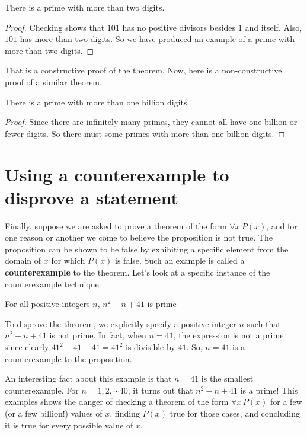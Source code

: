 \begin{thm}
 There is a prime with more than two digits.
\end{thm}
\begin{proof}
 Checking shows that $101$ has no positive divisors besides $1$ and itself. Also,
 $101$ has more than two digits. So we have produced an example of a prime with
 more than two digits.
\end{proof}

That is a constructive proof of the theorem. Now, here is a non-constructive proof
of a similar theorem.

\begin{thm}
 There is a prime with more than one billion digits.
\end{thm}
\begin{proof}
 Since there are infinitely many primes, they cannot all have one billion
 or fewer digits.
 So there must some primes with more than one billion digits.
\end{proof}


\section{Using a counterexample to disprove a statement}
Finally, suppose we are asked to prove a theorem of the form $\forall x\ P(x)$, and 
for one reason or another we come to believe the proposition is not true. The proposition
can be shown to be false by exhibiting a specific element from the domain of $x$ for
which $P(x)$ is false. Such an example is called a {\bfseries counterexample} to
the theorem. Let's look at a specific instance of the counterexample technique.

\clearpage
\begin{thm}
 For all positive integers 
$n$, $n^2-n+41$ is prime
\end{thm}
\begin{cntrxmpl}
To disprove the theorem,  we explicitly specify 
a positive integer $n$ such that $n^2-n+41$ is not prime. In fact, 
when $n=41$, the expression is not a prime since clearly $41^2-41+41 = 41^2$
is divisible by $41$. So, $n=41$ is a counterexample to the proposition. 
\end{cntrxmpl}


An interesting fact about this example is that $n=41$ is the smallest counterexample.
For $n = 1,2,\cdots 40$, it turns out that  $n^2-n+41$ is a prime! This examples
shows the danger of checking a theorem of the form $\forall x\, P(x)$ for a few
(or a few billion!) values of $x$, finding $P(x)$ true for those cases, and concluding it
is true for every possible value of $x$.

